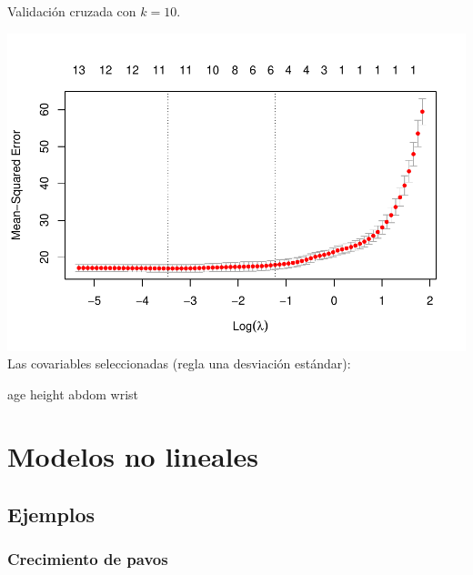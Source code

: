 \documentclass[
]{article}
\newenvironment{Shaded}{\begin{snugshade}}{\end{snugshade}}
\newcommand{\AttributeTok}[1]{\textcolor[rgb]{0.77,0.63,0.00}{#1}}
\newcommand{\DecValTok}[1]{\textcolor[rgb]{0.00,0.00,0.81}{#1}}
\newcommand{\FunctionTok}[1]{\textcolor[rgb]{0.00,0.00,0.00}{#1}}
\newcommand{\NormalTok}[1]{#1}
\newcommand{\OtherTok}[1]{\textcolor[rgb]{0.56,0.35,0.01}{#1}}
\newcommand{\SpecialCharTok}[1]{\textcolor[rgb]{0.00,0.00,0.00}{#1}}
\begin{document}
Validación cruzada con \(k=10\).

\begin{Shaded}
\end{Shaded}

\includegraphics{MLG2_files/figure-latex/kgrasa-1.pdf}
Las covariables seleccionadas (regla una desviación estándar):

age height abdom wrist

\hypertarget{modelos-no-lineales}{%
\section{Modelos no lineales}\label{modelos-no-lineales}}

\hypertarget{ejemplos-4}{%
\subsection{Ejemplos}\label{ejemplos-4}}

\hypertarget{crecimiento-de-pavos}{%
\subsubsection{Crecimiento de pavos}\label{crecimiento-de-pavos}}
\end{document}
